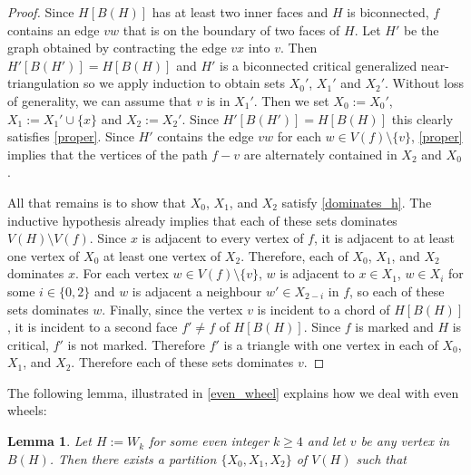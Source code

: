 \documentclass[12pt]{article}
\newtheorem{lem}{Lemma}
\theoremstyle{definition}
\newcommand{\pat}[1]{[\textcolor{red}{PM: #1}]}
\begin{document}
\begin{proof}
  Since $H[B(H)]$ has at least two inner faces and $H$ is biconnected, $f$ contains an edge $vw$ that is on the boundary of two faces of $H$.  Let $H'$ be the graph obtained by contracting the edge $vx$ into $v$. Then $H'[B(H')]=H[B(H)]$ and $H'$ is a biconnected critical generalized near-triangulation so we apply induction to obtain sets $X_0'$, $X_1'$ and $X_2'$.  Without loss of generality, we can assume that $v$ is in $X_1'$.  Then we set $X_0:=X_0'$, $X_1:=X_1'\cup\{x\}$ and $X_2:=X_2'$. Since $H'[B(H')]=H[B(H)]$ this clearly satisfies \cref{proper}.  Since $H'$ contains the edge $vw$ for each $w\in V(f)\setminus\{v\}$, \cref{proper} implies that the vertices of the path $f-v$ are alternately contained in $X_2$ and $X_0$.

  All that remains is to show that $X_0$, $X_1$, and $X_2$ satisfy \cref{dominates_h}.  The inductive hypothesis already implies that each of these sets dominates $V(H)\setminus V(f)$.  Since $x$ is adjacent to every vertex of $f$, it is adjacent to at least one vertex of $X_0$ at least one vertex of $X_2$.  Therefore, each of $X_0$, $X_1$, and $X_2$ dominates $x$.  For each vertex $w\in V(f)\setminus\{v\}$, $w$ is adjacent to $x\in X_1$, $w\in X_{i}$ for some $i\in\{0,2\}$ and $w$ is adjacent a neighbour $w'\in X_{2-i}$ in $f$, so each of these sets dominates $w$.  Finally, since the vertex $v$ is incident to a chord of $H[B(H)]$, it is incident to a second face $f'\neq f$ of $H[B(H)]$.  Since $f$ is marked and $H$ is critical, $f'$ is not marked.  Therefore $f'$ is a triangle with one vertex in each of $X_0$, $X_1$, and $X_2$. Therefore each of these sets dominates $v$.
\end{proof}

The following lemma, illustrated in \cref{even_wheel}
 explains how we deal with even wheels:

\begin{lem}\label{wheelie}
  Let $H:=W_k$ for some even integer $k\ge 4$ and let $v$ be any vertex in $B(H)$.  Then there exists a partition $\{X_0,X_1,X_2\}$ of $V(H)$ such that
\end{lem}
\end{document}
